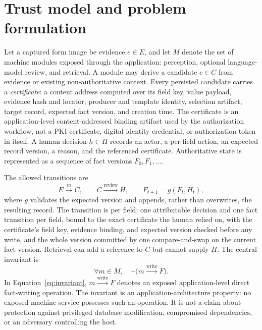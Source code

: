 \section{Trust model and problem formulation}
\label{sec:model}

Let a captured form image be evidence $e\in E$, and let $M$ denote the set of machine modules exposed through the application: perception, optional language-model review, and retrieval. A module may derive a candidate $c\in C$ from evidence or existing non-authoritative context. Every persisted candidate carries a \emph{certificate}: a content address computed over its field key, value payload, evidence hash and locator, producer and template identity, selection artifact, target record, expected fact version, and creation time. The certificate is an application-level content-addressed binding artifact used by the authorization workflow, not a PKI certificate, digital identity credential, or authorization token in itself. A human decision $h\in H$ records an actor, a per-field action, an expected record version, a reason, and the referenced certificate. Authoritative state is represented as a sequence of fact versions $F_0,F_1,\ldots$.

The allowed transitions are
\begin{equation}
  E\xrightarrow{m}C,\qquad C\xrightarrow{\text{review}}H,
  \qquad F_{t+1}=g(F_t,H_t),
  \label{eq:transitions}
\end{equation}
where $g$ validates the expected version and appends, rather than overwrites, the resulting record. The transition is per field: one attributable decision and one fact transition per field, bound to the exact certificate the human relied on, with the certificate's field key, evidence binding, and expected version checked before any write, and the whole version committed by one compare-and-swap on the current fact version. Retrieval can add a reference to $C$ but cannot supply $H$. The central invariant is
\begin{equation}
  \forall m\in M,\quad \neg\bigl(m\xrightarrow{\mathrm{write}}F\bigr).
  \label{eq:invariant}
\end{equation}
In Equation~\ref{eq:invariant}, $m\xrightarrow{\mathrm{write}}F$ denotes an exposed application-level direct fact-writing operation. The invariant is an application-architecture property: no exposed machine service possesses such an operation. It is not a claim about protection against privileged database modification, compromised dependencies, or an adversary controlling the host.

